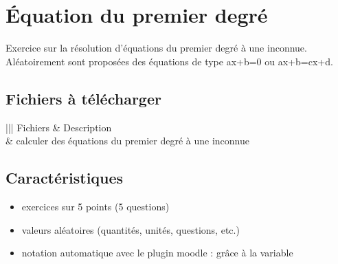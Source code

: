 \documentclass[letterpaper,10pt,french]{sphinxmanual}
\begin{document}
\section{Équation du premier degré}
\label{\detokenize{analyse alg_xe8bre - _xe9quation degr_xe91:equation-du-premier-degre}}\label{\detokenize{analyse alg_xe8bre - _xe9quation degr_xe91::doc}}
Exercice sur la résolution d’équations du premier degré à une inconnue.
Aléatoirement sont proposées des équations de type ax+b=0 ou ax+b=cx+d.



\subsection{Fichiers à télécharger}
\label{\detokenize{analyse alg_xe8bre - _xe9quation degr_xe91:fichiers-a-telecharger}}

\begin{savenotes}\sphinxattablestart
\centering
{}
\label{\detokenize{analyse alg_xe8bre - _xe9quation degr_xe91:id1}}
\sphinxaftercaption
\begin{tabular}[t]{|||}
\hline
\sphinxstyletheadfamily 
Fichiers
&\sphinxstyletheadfamily 
Description
\\
\hline
{}
&
calculer des équations du premier degré à une inconnue
\\
\hline
\end{tabular}
\par
\sphinxattableend\end{savenotes}


\subsection{Caractéristiques}
\label{\detokenize{analyse alg_xe8bre - _xe9quation degr_xe91:caracteristiques}}\begin{itemize}
\item {} 
exercices sur 5 points (5 questions)

\item {} 
valeurs aléatoires (quantités, unités, questions, etc.)

\item {} 
notation automatique avec le plugin moodle : grâce à la variable 

\end{itemize}
\end{document}
